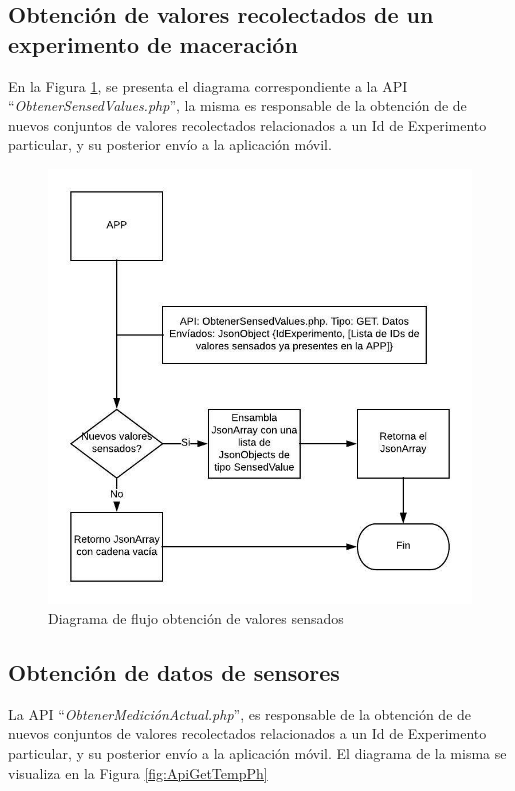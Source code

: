         \subsection{Obtención de valores recolectados de un experimento de maceración}
        \par En la Figura \ref{fig:ApiGet}, se presenta el diagrama correspondiente a la API ``\textit{ObtenerSensedValues.php}'', la misma es responsable de la obtención de de nuevos conjuntos de valores recolectados relacionados a un Id de Experimento particular, y su posterior envío a la aplicación móvil.
            \begin{figure} [htb]
                \centering
                \includegraphics{DiagramaAPIGet.jpeg}
                \caption{Diagrama de flujo obtención de valores sensados}
                \label{fig:ApiGet}
            \end{figure}
        
        \subsection{Obtención de datos de sensores}
        \par La API ``\textit{ObtenerMediciónActual.php}'', es responsable de la obtención de de nuevos conjuntos de valores recolectados relacionados a un Id de Experimento particular, y su posterior envío a la aplicación móvil. El diagrama de la misma se visualiza en la Figura \ref{fig:ApiGetTempPh}
        
